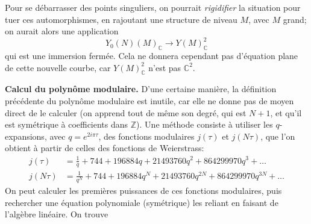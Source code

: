 \documentclass[11pt,a4paper]{article}
\newcommand{\Z}{\mathbb{Z}}
\newcommand{\C}{\mathbb{C}}
\newcommand{\vers}{\longrightarrow}
\theoremstyle{definition}
\begin{document}
Pour se débarrasser des points singuliers, on pourrait \emph{rigidifier} la situation pour tuer ces automorphismes, en rajoutant une structure de niveau $M$, avec $M$ grand; on aurait alors une application
$$Y_0(N)(M)_\C\vers Y(M)_\C^2$$
qui est une immersion fermée. Cela ne donnera cependant pas d'équation plane de cette nouvelle courbe, car $Y(M)_\C^2$ n'est pas $\C^2$.


\textbf{Calcul du polynôme modulaire.} D'une certaine manière, la définition précédente du polynôme modulaire est inutile, car elle ne donne pas de moyen direct de le calculer (on apprend tout de même son degré, qui est $N+1$, et qu'il est symétrique à coefficients dans $\Z$). Une méthode consiste à utiliser les $q$-expansions, avec $q = e^{2i\pi\tau}$, des fonctions modulaires $j(\tau)$ et $j(N\tau)$, que l'on obtient à partir de celles des fonctions de Weierstrass:
$$\begin{aligned}
j(\tau) &= \frac{1}{q} + 744 + 196884 q + 21493760 q^2 + 864299970 q^3 + \ldots\\
j(N\tau) &= \frac{1}{q^N} + 744 + 196884 q^N + 21493760 q^{2N} + 864299970 q^{3N} + \ldots
\end{aligned}$$
On peut calculer les premières puissances de ces fonctions modulaires, puis rechercher une équation polynomiale (symétrique) les reliant en faisant de l'algèbre linéaire. On trouve
\end{document}
